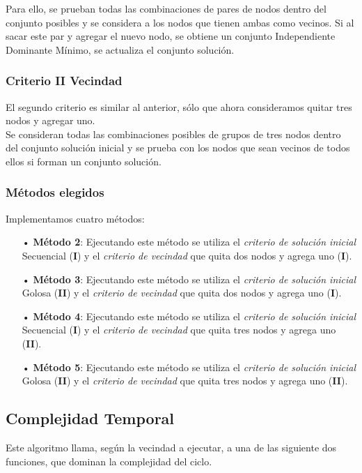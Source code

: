 Para ello, se prueban todas las combinaciones de pares de nodos dentro del conjunto posibles y se considera a los nodos que tienen ambas como vecinos. Si al sacar este par y agregar el nuevo nodo, se obtiene un conjunto Independiente Dominante M\'inimo, se actualiza el conjunto soluci\'on. 

\subsubsection*{Criterio II Vecindad}

El segundo criterio es similar al anterior, s\'olo que ahora consideramos quitar tres nodos y agregar uno.\\

Se consideran todas las combinaciones posibles de grupos de tres nodos dentro del conjunto soluci\'on inicial y se prueba con los nodos que sean vecinos de todos ellos si forman un conjunto soluci\'on.\\

\subsubsection{M\'etodos elegidos}

Implementamos cuatro m\'etodos:

\begin{itemize}
\item[•] \textbf{M\'etodo 2}: Ejecutando este m\'etodo se utiliza el \textit{criterio de soluci\'on inicial} Secuencial (\textbf{I}) y el \textit{criterio de vecindad} que quita dos nodos y agrega uno (\textbf{I}).
\item[•] \textbf{M\'etodo 3}: Ejecutando este m\'etodo se utiliza el \textit{criterio de soluci\'on inicial} Golosa (\textbf{II}) y el \textit{criterio de vecindad} que quita dos nodos y agrega uno (\textbf{I}).
\item[•] \textbf{M\'etodo 4}: Ejecutando este m\'etodo se utiliza el \textit{criterio de soluci\'on inicial} Secuencial (\textbf{I}) y el \textit{criterio de vecindad} que quita tres nodos y agrega uno (\textbf{II}).
\item[•] \textbf{M\'etodo 5}: Ejecutando este m\'etodo se utiliza el \textit{criterio de soluci\'on inicial} Golosa (\textbf{II}) y el \textit{criterio de vecindad} que quita tres nodos y agrega uno (\textbf{II}).
\end{itemize}

\newpage
\subsection{Complejidad Temporal}
Este algoritmo llama, seg\'un la vecindad a ejecutar, a una de las siguiente dos funciones, que dominan la complejidad del ciclo.

